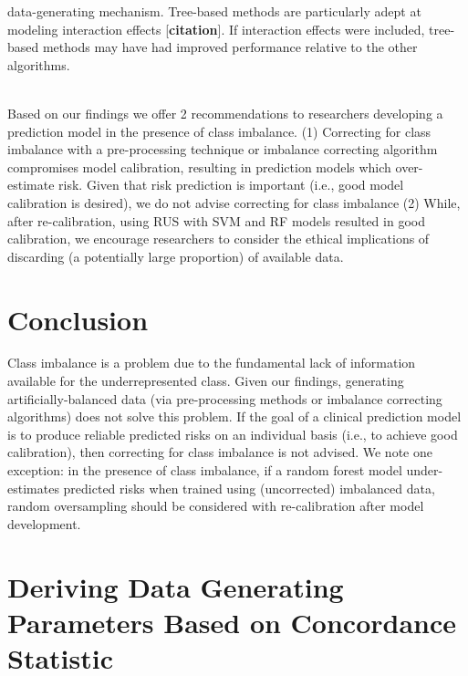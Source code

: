\documentclass[AMA,STIX1COL,]{WileyNJD-v2}
\begin{document}
data-generating mechanism. Tree-based methods are particularly adept at
modeling interaction effects {[}\textbf{citation}{]}. If interaction
effects were included, tree-based methods may have had improved
performance relative to the other algorithms.\\
\strut \\
Based on our findings we offer 2 recommendations to researchers
developing a prediction model in the presence of class imbalance. (1)
Correcting for class imbalance with a pre-processing technique or
imbalance correcting algorithm compromises model calibration, resulting
in prediction models which over-estimate risk. Given that risk
prediction is important (i.e., good model calibration is desired), we do
not advise correcting for class imbalance (2) While, after
re-calibration, using RUS with SVM and RF models resulted in good
calibration, we encourage researchers to consider the ethical
implications of discarding (a potentially large proportion) of available
data.

\hypertarget{conclusion}{%
\section{Conclusion}\label{conclusion}}

Class imbalance is a problem due to the fundamental lack of information
available for the underrepresented class. Given our findings, generating
artificially-balanced data (via pre-processing methods or imbalance
correcting algorithms) does not solve this problem. If the goal of a
clinical prediction model is to produce reliable predicted risks on an
individual basis (i.e., to achieve good calibration), then correcting
for class imbalance is not advised. We note one exception: in the
presence of class imbalance, if a random forest model under-estimates
predicted risks when trained using (uncorrected) imbalanced data, random
oversampling should be considered with re-calibration after model
development.

\newpage

\appendix

\section{Deriving Data Generating Parameters Based on Concordance Statistic}
\end{document}
